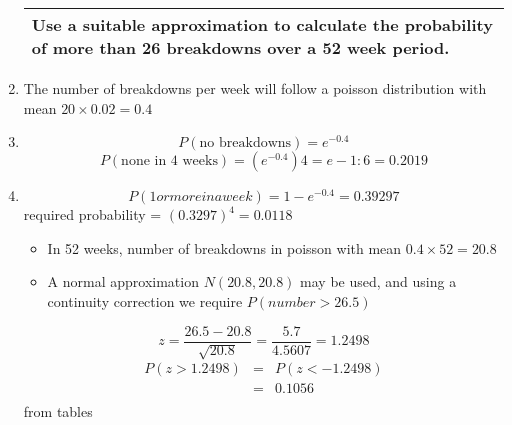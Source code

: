 \documentclass[a4paper,12pt]{article}
\begin{document}
\begin{enumerate}
\begin{table}[ht!]
\begin{tabular}{|p{15cm}|}
Use a suitable approximation to calculate the probability of more than 26 breakdowns over a 52 week period.   
 \\ \hline 
      \end{tabular}
    \end{table}
\item  The number of breakdowns per week will follow a poisson distribution with mean
$20 \times 0.02 = 0.4$
\item 
\[P(\mbox{no breakdowns}) = e^{-0.4}\]
\[P(\mbox{none in 4 weeks}) = (e^{-0.4})4 = e-1:6 = 0.2019\]
\item 
\[P(1 or more in a week) = 1 - e^{-0.4} = 0.39297\]
required probability = $(0.3297)^4 = 0.0118$
\begin{itemize}
    \item In 52 weeks, number of breakdowns in poisson with mean $0.4 \times 52 = 20.8$ 
    \item A normal
approximation $N(20.8,20.8)$ may be used, and using a continuity correction we
require $P(number > 26.5)$
\end{itemize}

\[z = \frac{26.5-20.8}{\sqrt{20.8}} = \frac{5.7}{4.5607} = 1.2498\]
\begin{eqnarray*}
P(z > 1.2498) 
&=& P(z < -1.2498) \\
&=& 0.1056\\
\end{eqnarray*} from tables
\end{enumerate}
\end{document}
